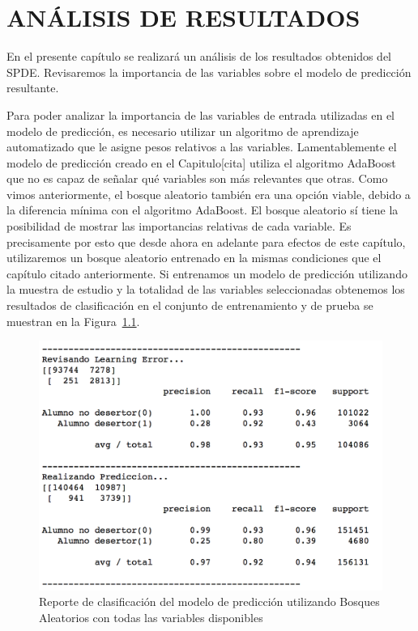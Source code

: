 \chapter{ANÁLISIS DE RESULTADOS}
\label{ch:anarel}

En el presente capítulo se realizará un análisis de los resultados obtenidos del SPDE. Revisaremos la importancia de las variables sobre el modelo de predicción resultante.

Para poder analizar la importancia de las variables de entrada utilizadas en el modelo de predicción, es necesario utilizar un algoritmo de aprendizaje automatizado que le asigne pesos relativos a las variables. Lamentablemente el modelo de predicción creado en el Capitulo[cita] utiliza el algoritmo AdaBoost que no es capaz de señalar qué variables son más relevantes que otras. Como vimos anteriormente, el bosque aleatorio también era una opción viable, debido a la diferencia mínima con el algoritmo AdaBoost. El bosque aleatorio sí tiene la posibilidad de mostrar las importancias relativas de cada variable. Es precisamente por esto que desde ahora en adelante para efectos de este capítulo, utilizaremos un bosque aleatorio entrenado en la mismas condiciones que el capítulo citado anteriormente.
Si entrenamos un modelo de predicción utilizando la muestra de estudio y la totalidad de las variables seleccionadas obtenemos los resultados de clasificación en el conjunto de entrenamiento y de prueba se muestran en la Figura~\ref{fig:clas-total}.

\begin{figure}[H]
  \centering
    \includegraphics[trim=0cm 0cm 0cm 0cm,scale=0.65]{Figuras/7AnalisisResultado/clas-total.png}
      \caption{Reporte de clasificación del modelo de predicción utilizando Bosques Aleatorios con todas las variables disponibles}
    \label{fig:clas-total}
\end{figure}

